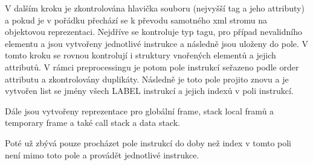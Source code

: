 V dalším kroku je zkontrolována hlavička souboru (nejvyšší tag a jeho attributy) a pokud je v pořádku přechází se k převodu samotného xml stromu na objektovou reprezentaci.
Nejdříve se kontroluje typ tagu, pro případ nevalidního elementu a jsou vytvořeny jednotlivé instrukce a následně jsou uloženy do pole. V tomto kroku se rovnou kontrolují i struktury vnořených elementů a jejich attributů.
V rámci preprocessingu je potom pole instrukcí seřazeno podle order attributu a zkontrolovány duplikáty. Následně je toto pole projito znovu a je vytvořen list se jmény všech LABEL instrukcí a jejich indexů v poli instrukcí.

Dále jsou vytvořeny reprezentace pro globální frame, stack local framů a temporary frame a také call stack a data stack.

Poté už zbývá pouze procházet pole instrukcí do doby než index v tomto poli není mimo toto pole a provádět jednotlivé instrukce.